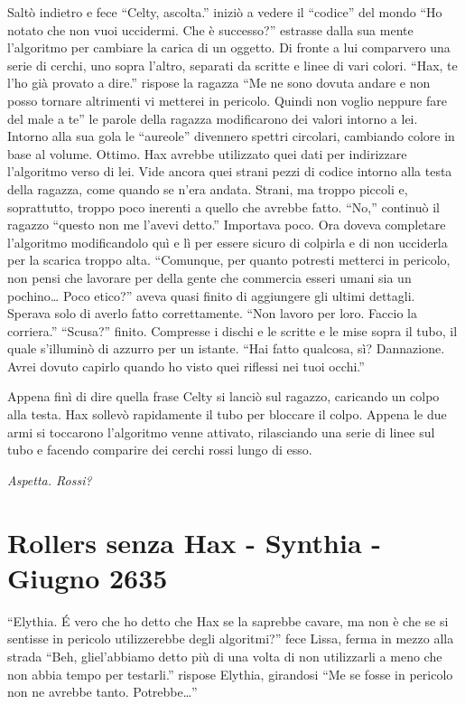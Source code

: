     Saltò indietro e fece ``Celty, ascolta.'' iniziò a vedere il ``codice''
    del mondo ``Ho notato che non vuoi uccidermi. Che è successo?''
    estrasse dalla sua mente l'algoritmo per cambiare la carica di un
    oggetto. Di fronte a lui comparvero una serie di cerchi, uno sopra
    l'altro, separati da scritte e linee di vari colori. ``Hax, te l'ho già
    provato a dire.'' rispose la ragazza ``Me ne sono dovuta andare e non
    posso tornare altrimenti vi metterei in pericolo. Quindi non voglio
    neppure fare del male a te'' le parole della
    ragazza modificarono dei valori intorno a lei. Intorno alla sua gola le
    ``aureole'' divennero spettri circolari, cambiando colore in base al
    volume. Ottimo. Hax avrebbe utilizzato quei dati per indirizzare
    l'algoritmo verso di lei. Vide ancora quei
    strani pezzi di codice intorno alla testa della ragazza, come quando se
    n'era andata. Strani, ma troppo piccoli e, soprattutto, troppo poco
    inerenti a quello che avrebbe fatto. ``No,'' continuò il ragazzo
    ``questo non me l'avevi detto.'' Importava poco. Ora doveva completare
    l'algoritmo modificandolo quì e lì per essere sicuro di colpirla e di
    non ucciderla per la scarica troppo alta. ``Comunque, per quanto
    potresti metterci in pericolo, non pensi che lavorare per della gente
    che commercia esseri umani sia un pochino\dots{} Poco etico?'' aveva
    quasi finito di aggiungere gli ultimi dettagli. Sperava solo di averlo
    fatto correttamente. ``Non lavoro per loro. Faccio la corriera.''
    ``Scusa?'' finito. Compresse i dischi e le scritte e le mise sopra il
    tubo, il quale s'illuminò di azzurro per un istante. ``Hai fatto
    qualcosa, sì? Dannazione. Avrei dovuto capirlo quando ho visto quei
    riflessi nei tuoi occhi.''

    Appena finì di dire quella frase Celty si lanciò sul ragazzo, caricando
    un colpo alla testa. Hax sollevò rapidamente il tubo per bloccare il
    colpo. Appena le due armi si toccarono l'algoritmo venne attivato,
    rilasciando una serie di linee sul tubo e facendo comparire dei cerchi
    rossi lungo di esso.

    \emph{Aspetta. Rossi?}

    \section{Rollers senza Hax - Synthia - Giugno 2635}
    ``Elythia. \'E vero che ho detto che Hax se la saprebbe cavare, ma non
    è che se si sentisse in pericolo utilizzerebbe degli algoritmi?'' fece
    Lissa, ferma in mezzo alla strada ``Beh, gliel'abbiamo detto più di una
    volta di non utilizzarli a meno che non abbia tempo per testarli.''
    rispose Elythia, girandosi ``Me se fosse in pericolo non ne avrebbe
    tanto. Potrebbe\dots{}''

